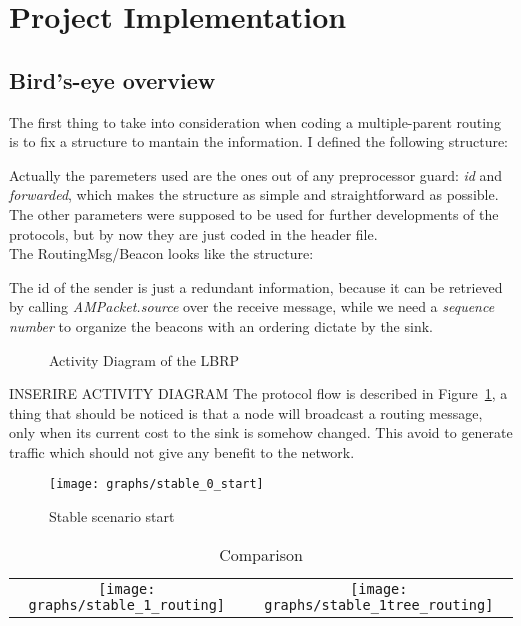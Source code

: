 \documentclass{article}
\begin{document}
\clearpage

\section{Project Implementation}
\subsection{Bird's-eye overview}
The first thing to take into consideration when coding a multiple-parent routing is to fix a structure to mantain the information. I defined the following structure:

Actually the paremeters used are the ones out of any preprocessor guard: \textit{id} and \textit{forwarded}, which makes the structure as simple and straightforward as possible. The other parameters were supposed to be used for further developments of the protocols, but by now they are just coded in the header file.
\\The RoutingMsg/Beacon looks like the structure:

The id of the sender is just a redundant information, because it can be retrieved by calling \textit{AMPacket.source} over the receive message, while we need a \textit{sequence number} to organize the beacons with an ordering dictate by the sink.
\begin{figure}[H]
\caption{Activity Diagram of the LBRP}
\label{fig:activityLBRP}
\end{figure}
INSERIRE ACTIVITY DIAGRAM	
The protocol flow is described in Figure~\ref{fig:activityLBRP}, a thing that should be noticed is that a node will broadcast a routing message, only when its current cost to the sink is somehow changed. This avoid to generate traffic which should not give any benefit to the network.
\begin{figure}[H]
\begin{center}
\texttt{[image: graphs/stable\_0\_start]}
\caption{Stable scenario start}
\label{fig:stableStart}
\end{center}
\end{figure}

\begin{table}[H]
\centering
\begin{tabular}{cc}
\texttt{[image: graphs/stable\_1\_routing]}&\texttt{[image: graphs/stable\_1tree\_routing]}\\
\end{tabular}
\caption{Comparison}
\label{tab:comparisonProto}
\end{table}
\end{document}
